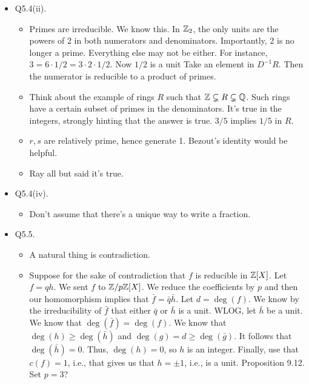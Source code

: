 \documentclass[../notes.tex]{subfiles}
\begin{document}
\begin{itemize}
\begin{itemize}
    \end{itemize}
    \item Q5.4(ii).
    \begin{itemize}
        \item Primes are irreducible. We know this. In $\mathbb{Z}_2$, the only units are the powers of 2 in both numerators and denominators. Importantly, 2 is no longer a prime. Everything else may not be either. For instance, $3=6\cdot 1/2=3\cdot 2\cdot 1/2$. Now $1/2$ is a unit Take an element in $D^{-1}R$. Then the numerator is reducible to a product of primes.
        \item Think about the example of rings $R$ such that $\mathbb{Z}\subsetneq R\subsetneq\mathbb{Q}$. Such rings have a certain subset of primes in the denominators. It's true in the integers, strongly hinting that the answer is true. $3/5$ implies $1/5$ in $R$.
        \item $r,s$ are relatively prime, hence generate 1. Bezout's identity would be helpful.
        \item Ray all but said it's true.
    \end{itemize}
    \item Q5.4(iv).
    \begin{itemize}
        \item Don't assume that there's a unique way to write a fraction.
    \end{itemize}
    \item Q5.5.
    \begin{itemize}
        \item A natural thing is contradiction.
        \item Suppose for the sake of contradiction that $f$ is reducible in $\mathbb{Z}[X]$. Let $f=qh$. We sent $f$ to $\mathbb{Z}/p\mathbb{Z}[X]$. We reduce the coefficients by $p$ and then our homomorphism implies that $\bar{f}=\bar{q}\bar{h}$. Let $d=\deg(f)$. We know by the irreducibility of $\bar{f}$ that either $\bar{q}$ or $\bar{h}$ is a unit. WLOG, let $\bar{h}$ be a unit. We know that $\deg(\bar{f})=\deg(f)$. We know that $\deg(h)\geq\deg(\bar{h})$ and $\deg(g)=d\geq\deg(\bar{g})$. It follows that $\deg(\bar{h})=0$. Thus, $\deg(h)=0$, so $h$ is an integer. Finally, use that $c(f)=1$, i.e., that gives us that $h=\pm 1$, i.e., is a unit. Proposition 9.12. Set $p=3$?
    \end{itemize}
\end{itemize}
\end{document}
